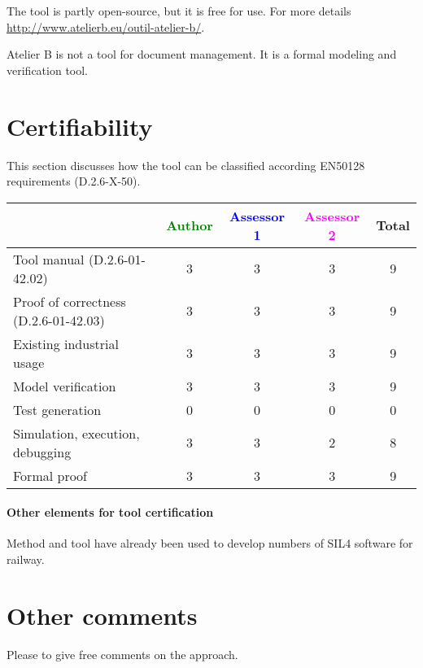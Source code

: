 \begin{author_comment}
The tool is partly open-source, but it is free for use.
For more details \url{http://www.atelierb.eu/outil-atelier-b/}.
\end{author_comment}


\begin{assessor2}
Atelier B is not a tool for document management. It is a formal modeling and verification tool.
\end{assessor2}

\section{Certifiability}

This section discusses how the tool can be classified according EN50128 requirements (D.2.6-X-50).


\begin{tabular}{|l | c | c | c | c|}
\hline
& \textcolor{green}{Author} & \textcolor{blue}{Assessor 1} & \textcolor{magenta}{Assessor 2} & Total \\
\hline 
Tool manual (D.2.6-01-42.02) & 3 & 3 & 3 & 9 \\
\hline
Proof of correctness (D.2.6-01-42.03)   & 3 & 3 & 3 & 9 \\
\hline
Existing industrial  usage  & 3  & 3 & 3 & 9 \\
\hline
Model verification & 3 & 3 & 3 & 9 \\
\hline
Test generation & 0 & 0 & 0 & 0 \\
\hline
Simulation, execution, debugging & 3 & 3 & 2 & 8 \\
\hline
Formal proof & 3 & 3 & 3 & 9 \\
\hline
\end{tabular}

\paragraph{Other elements for tool certification}


\begin{author_comment}
Method and tool have already been used to  develop numbers of  SIL4 software for railway.
\end{author_comment}


\section{Other comments}
Please to  give free comments on the approach.
